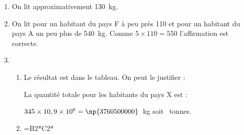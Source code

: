 \begin{enumerate}
	\item %
On lit approximativement 130~kg.
	\item %
On lit pour un habitant du pays F à peu près 110 et pour un habitant du pays A un peu plus de 540~kg. Comme $5 \times 110 = 550$ l'affirmation est correcte.	
	\item %

%

	\begin{enumerate}
		\item  %
Le résultat est dans le tableau. On peut le justifier :

La quantité totale pour les habitants du pays X est :
		
$345 \times 10,9 \times 10^6 = \np{3760500000}$~kg soit ~tonnes.	
		\item %
		
\textsf{=B2*C2*}
	\end{enumerate}
\end{enumerate}

\vspace{0,5cm}

